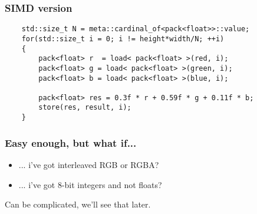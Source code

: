 \begin{frame}[fragile]
	\frametitle{SIMD version}
	
	\begin{lstlisting}
	std::size_t N = meta::cardinal_of<pack<float>>::value;
	for(std::size_t i = 0; i != height*width/N; ++i)
	{
	    pack<float> r  = load< pack<float> >(red, i);
	    pack<float> g = load< pack<float> >(green, i);
	    pack<float> b = load< pack<float> >(blue, i);
		
	    pack<float> res = 0.3f * r + 0.59f * g + 0.11f * b;
	    store(res, result, i);
	}
	\end{lstlisting}
	
\end{frame}

\begin{frame}
	\frametitle{Easy enough, but what if...}

	\begin{itemize}
		\item ... i've got interleaved RGB or RGBA?
		\item ... i've got 8-bit integers and not floats?
	\end{itemize}
	
	Can be complicated, we'll see that later.
	
\end{frame}